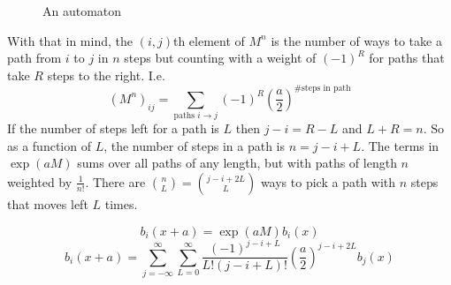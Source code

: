 \documentclass{article}
\begin{document}
\begin{figure}
\centering
{}
\caption{An automaton}
\label{automaton}
\end{figure}
With that in mind, the $(i,j)$th element of $M^n$ is the number of ways to take a path from $i$ to $j$ in $n$ steps but counting with a weight of $(-1)^R$ for paths that take $R$ steps to the right.
I.e.
\[
(M^n)_{ij} = \sum_{\mbox{paths }i\rightarrow j} (-1)^R (\frac{a}{2})^{\#\mbox{steps in path}}
\]
If the number of steps left for a path is $L$ then $j-i=R-L$ and $L+R=n$.
So as a function of $L$, the number of steps in a path is $n=j-i+L$.
The terms in $\exp(aM)$ sums over all paths of any length, but with paths of length $n$ weighted by $\frac{1}{n!}$.
There are $\binom{n}{L}=\binom{j-i+2L}{L}$ ways to pick a path with $n$ steps that moves left $L$ times.

\[
b_i(x+a) = \exp(aM)b_i(x)
\]
\[
b_i(x+a) = \sum_{j=-\infty}^\infty\sum_{L=0}^\infty\frac{(-1)^{j-i+L}}{L!(j-i+L)!}(\frac{a}{2})^{j-i+2L} b_j(x)
\]
\end{document}
